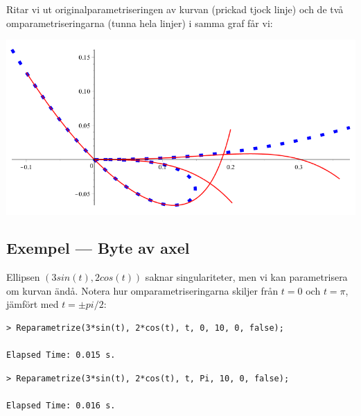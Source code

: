 \vspace{20pt}
Ritar vi ut originalparametriseringen av kurvan (prickad tjock linje) och de två omparametriseringarna (tunna hela linjer) i samma graf får vi:

\begin{center}
\includegraphics[scale=0.35]{Export/kurvorplot2d1.png}
\end{center}

\subsection{Exempel --- Byte av axel}

Ellipsen $\left(3 sin(t), 2 cos(t)\right)$ saknar singulariteter, men vi kan parametrisera om kurvan ändå. Notera hur omparametriseringarna skiljer från $t=0$ och $t=\pi$, jämfört med $t=\pm pi/2$:

\begin{maplegroup}
\begin{verbatim}
> Reparametrize(3*sin(t), 2*cos(t), t, 0, 10, 0, false);

Elapsed Time: 0.015 s.
\end{verbatim}
\mapleresult
\begin{maplelatex}
\end{maplelatex}
\end{maplegroup}

\begin{maplegroup}
\begin{verbatim}
> Reparametrize(3*sin(t), 2*cos(t), t, Pi, 10, 0, false);

Elapsed Time: 0.016 s.
\end{verbatim}
\mapleresult
\begin{maplelatex}
\end{maplelatex}
\end{maplegroup}

